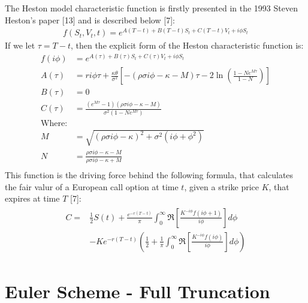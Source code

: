\documentclass[12pt,twoside]{reedthesis}
\theoremstyle{definition}
\theoremstyle{definition}
\theoremstyle{remark}
\begin{document}
  The Heston model characteristic function is firstly presented in the
  1993 Steven Heston's paper {[}13{]} and is described below {[}7{]}:
  \begin{align}
  f(S_t, V_t, t) = e^{A(T-t)+B(T-t)S_t + C(T-t)V_t + i \phi S_t}
  \end{align}
  If we let \(\tau = T-t\), then the explicit form of the Heston
  characteristic function is:
  \begin{align*}
  f(i \phi) &= e^{A(\tau)+B(\tau)S_t + C(\tau)V_t + i \phi S_t} \\
  A(\tau) &= r i \phi \tau + \frac{\kappa \theta}{\sigma^2} \left[ - (\rho \sigma i \phi - \kappa - M) \tau - 2 \ln\left(\frac{1-N e^{M \tau}}{1-N}\right) \right] \\
  B(\tau) &= 0 \\
  C(\tau) &= \frac{(e^{M \tau}-1)(\rho \sigma i \phi - \kappa - M)}{\sigma^2 (1-N e^{M \tau})} \\
  \text{Where:} & \\
  M &= \sqrt{(\rho \sigma i \phi - \kappa)^2 + \sigma^2 (i \phi + \phi^2)} \\
  N &= \frac{\rho \sigma i \phi - \kappa - M}{\rho \sigma i \phi - \kappa + M} \\
  \end{align*}
  This function is the driving force behind the following formula, that
  calculates the fair valur of a European call option at time \(t\), given
  a strike price \(K\), that expires at time \(T\) {[}7{]}:
  \begin{align} 
  \label{eq:cfheston}
  \begin{split}
  C = & \frac{1}{2} S(t) + \frac{e^{-r(T-t)}}{\pi}\int_{0}^{\infty}{\Re \left[ \frac{K^{-i \phi} f(i \phi + 1)}{i \phi} \right] d\phi} \\
  & -Ke^{-r(T-t)}\left( \frac{1}{2} + \frac{1}{\pi} \int_{0}^{\infty}{\Re \left[ \frac{K^{-i \phi} f(i \phi)}{i \phi} \right]}  d\phi \right)
  \end{split}
  \end{align}
  \section{Euler Scheme - Full
  Truncation}\label{euler-scheme---full-truncation}
  
\end{document}
